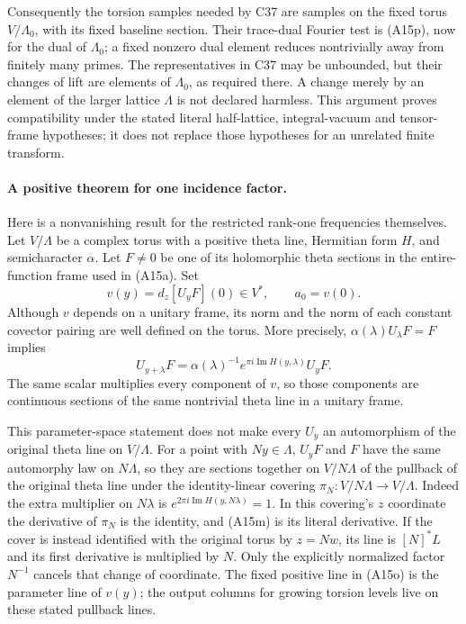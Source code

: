 \documentclass[11pt]{article}
\theoremstyle{definition}\newtheorem{definition}[theorem]{Definition}\newtheorem{remark}[theorem]{Remark}
\begin{document}
Consequently the torsion samples needed by C37 are samples on
the fixed torus $V/\Lambda_0$, with its fixed baseline section.
Their trace-dual Fourier test is (A15p), now for the dual of
$\Lambda_0$; a fixed nonzero dual element reduces nontrivially
away from finitely many primes.  The representatives in C37 may
be unbounded, but their changes of lift are elements of
$\Lambda_0$, as required there.  A change merely by an element
of the larger lattice $\Lambda$ is not declared harmless.
This argument proves compatibility under the stated literal
half-lattice, integral-vacuum and tensor-frame hypotheses; it
does not replace those hypotheses for an unrelated finite
transform.

\paragraph{A positive theorem for one incidence factor.}
Here is a nonvanishing result for the restricted rank-one frequencies
themselves.  Let $V/\Lambda$ be a complex torus with a positive theta
line, Hermitian form $H$, and semicharacter $\alpha$.  Let $F\ne0$
be one of its holomorphic theta sections in the entire-function
frame used in (A15a).  Set
\[
       v(y)=d_z[U_yF](0)\in V^*,\qquad a_0=v(0).
 \tag{A15m}
\]
Although $v$ depends on a unitary frame, its norm and the norm of
each constant covector pairing are well defined on the torus.
More precisely, $\alpha(\lambda)U_\lambda F=F$ implies
\[
 U_{y+\lambda}F
    =\alpha(\lambda)^{-1}
       e^{\pi i\operatorname{Im}H(y,\lambda)}U_yF.
 \tag{A15n}
\]
The same scalar multiplies every component of $v$, so those
components are continuous sections of the same nontrivial theta
line in a unitary frame.

This parameter-space statement does not make every $U_y$ an
automorphism of the original theta line on $V/\Lambda$.
For a point with $Ny\in\Lambda$, $U_yF$ and $F$ have the same
automorphy law on $N\Lambda$, so they are sections together on
$V/N\Lambda$ of the pullback of the original theta line under
the identity-linear covering
$\pi_N:V/N\Lambda\longrightarrow V/\Lambda$.
Indeed the extra multiplier on $N\lambda$ is
$e^{2\pi i\operatorname{Im}H(y,N\lambda)}=1$.
In this covering's $z$ coordinate the derivative of $\pi_N$ is
the identity, and (A15m) is its literal derivative.  If the cover
is instead identified with the original torus by $z=Nw$, its
line is $[N]^*L$ and its first derivative is multiplied by $N$.
Only the explicitly normalized factor $N^{-1}$ cancels that
change of coordinate.  The fixed positive line in (A15o) is
the parameter line of $v(y)$; the output columns for growing
torsion levels live on these stated pullback lines.
\end{document}
